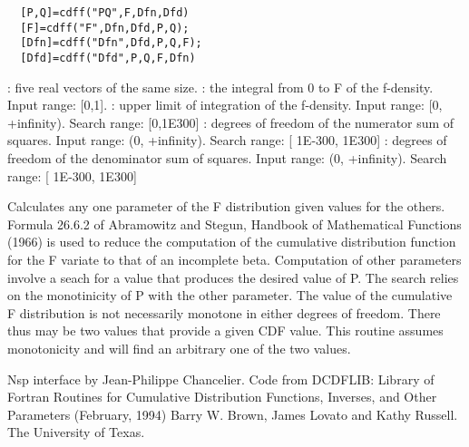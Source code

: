 
\begin{mandesc}
\end{mandesc}
\label{cdff}
\begin{calling_sequence}
\begin{verbatim}
  [P,Q]=cdff("PQ",F,Dfn,Dfd)  
  [F]=cdff("F",Dfn,Dfd,P,Q);  
  [Dfn]=cdff("Dfn",Dfd,P,Q,F);  
  [Dfd]=cdff("Dfd",P,Q,F,Dfn)  
\end{verbatim}
\end{calling_sequence}
\begin{parameters}
  \begin{varlist}
    : five real vectors of the same size.
    :  the integral from 0 to F of the f-density. Input range: [0,1].
    : upper limit of integration of the f-density. Input range: [0, +infinity). Search range: [0,1E300]
      : degrees of freedom of the numerator sum of squares. Input range: (0, +infinity). Search range: [ 1E-300, 1E300]
      : degrees of freedom of the denominator sum of squares. Input range: (0, +infinity). Search range: [ 1E-300, 1E300]
  \end{varlist}
\end{parameters}
\begin{mandescription}
  Calculates any one parameter of the F distribution
  given values for the others.
  Formula   26.6.2   of   Abramowitz   and   Stegun,  Handbook  of
  Mathematical  Functions (1966) is used to reduce the computation
  of the  cumulative  distribution function for the  F  variate to
  that of an incomplete beta.
  Computation of other parameters involve a seach for a value that
  produces  the desired  value  of P.   The search relies  on  the
  monotinicity of P with the other parameter.
  The value of the  cumulative  F distribution is  not necessarily
  monotone in  either degrees of freedom.  There  thus may  be two
  values  that  provide a given CDF  value.   This routine assumes
  monotonicity and will find an arbitrary one of the two values.
\end{mandescription}

\begin{authors}
  Nsp interface by Jean-Philippe Chancelier. Code from DCDFLIB: 
  Library of Fortran Routines for Cumulative Distribution
  Functions, Inverses, and Other Parameters (February, 1994)
  Barry W. Brown, James Lovato and Kathy Russell. The University of Texas.
\end{authors}

